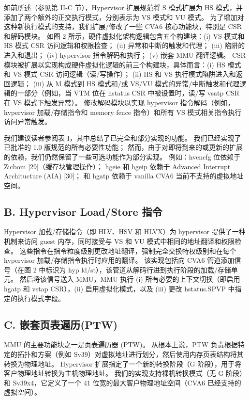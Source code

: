 如前所述（参见第 II-C 节），Hypervisor 扩展规范将 S 模式扩展为 HS 模式，并添加了两个额外的正交执行模式，分别表示为 VS 模式和 VU 模式。 为了增加对这种新执行模式的支持，我们扩展/修改了一些 CVA6 核心功能块，特别是 CSR 和解码模块。 如图 2 所示，硬件虚拟化架构逻辑包含五个构建块：(i) VS 模式和 HS 模式 CSR 访问逻辑和权限检查； (ii) 异常和中断的触发和代理； (iii) 陷阱的进入和退出； (iv) hypervisor 指令解码和执行； (v) 嵌套 MMU 翻译逻辑。 CSR 模块被扩展以实现构成硬件虚拟化逻辑的前三个构建块，具体而言：(i) HS 模式和 VS 模式 CSR 访问逻辑（读/写操作）； (ii) HS 和 VS 执行模式陷阱进入和返回逻辑； (iii) 从 M 模式到 HS 模式和/或 VS/VU 模式的异常/中断触发和代理逻辑的一部分（例如，当 VTM 位在 hstatus CSR 中被设置时，读/写 vsatp CSR 在 VS 模式下触发异常）。 修改解码模块以实现 hypervisor 指令解码（例如，hypervisor 加载/存储指令和 memory fence 指令）和所有 VS 模式相关指令执行访问异常触发。

我们建议读者参阅表 I，其中总结了已完全和部分实现的功能。 我们已经实现了已批准的 1.0 版规范的所有必要性功能； 然而，由于对即将到来的或更新的扩展的依赖，我们仍然保留了一些可选功能作为部分实现。 例如：hvencfg 位依赖于 Zicbom [29]（缓存块管理操作）； hgeie 和 hgeip 依赖于 Advanced Interrupt Architucture (AIA) [30]； 和 hgatp 依赖于 vanilla CVA6 当前不支持的虚拟地址空间。

\subsection*{B. Hypervisor Load/Store 指令}

Hypervisor 加载/存储指令（即 HLV、HSV 和 HLVX）为 hypervisor 提供了一种机制来访问 guest 内存，同时接受与 VS 和 VU 模式中相同的地址翻译和权限检查。 这些指令在指令粒度级别更改地址翻译，强制完全交换特权级别和在每个 hypervisor 加载/存储指令执行时应用的翻译。 该实现包括向 CVA6 管道添加信号（在图 2 中标识为 hyp ld/st），该管道从解码行进到执行阶段的加载/存储单元。 然后将该信号送入 MMU，MMU 执行 (i) 所有必要的上下文切换（即启用 hgatp 和 vstap CSR），(ii) 启用虚拟化模式，以及 (iii) 更改 hstatus.SPVP 中指定的执行模式字段。

\subsection*{C. 嵌套页表遍历(PTW)}

MMU 的主要功能块之一是页表遍历器 (PTW)。 从根本上说，PTW 负责根据特定的拓扑和方案（例如 Sv39）对虚拟地址进行划分，然后使用内存页表结构将其转换为物理地址。 Hypervisor 扩展指定了一个新的转换阶段（G 阶段），用于将客户物理地址转换为主机物理地址。 我们的实现支持裸机转换模式（无 G 阶段）和 Sv39x4，它定义了一个 41 位宽的最大客户物理地址空间（CVA6 已经支持的虚拟空间）。

